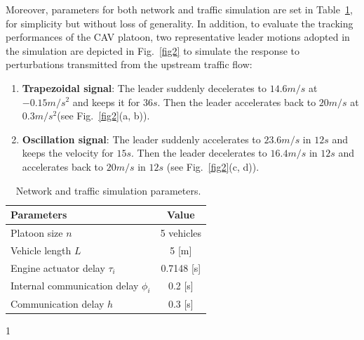 \documentclass[a4paper]{cas-sc}
\begin{document}
Moreover, parameters for both network and traffic simulation are set in Table~\ref{table1}, for simplicity but without loss of generality. In addition, to evaluate the tracking performances of the CAV platoon, two representative leader motions adopted in the simulation are depicted in Fig.~\ref{fig2} to simulate the response to perturbations transmitted from the upstream traffic flow:
\begin{enumerate}
  \item \textbf{Trapezoidal signal}: The leader suddenly decelerates to $14.6m/s$ at $ - 0.15m/{s^2}$ and keeps it for $36s$. Then the leader accelerates back to $20m/s$ at $ 0.3m/{s^2} $(see Fig.~\ref{fig2}(a, b)).
  \item \textbf{Oscillation signal}: The leader suddenly accelerates to $23.6m/s$ in $12s$ and keeps the velocity for $15s$. Then the leader decelerates to $16.4m/s$ in $12s$ and accelerates back to $20m/s$ in $12s$ (see Fig.~\ref{fig2}(c, d)).
\end{enumerate}

\begin{table}
  \centering
  \setlength{\abovecaptionskip}{0pt}
  \setlength{\belowcaptionskip}{10pt}%
  \begin{threeparttable}[b]
    \caption{~Network and traffic simulation parameters.}
    \label{table1}
    {\begin{tabular}{lc} \toprule
        Parameters                              & Value                \\ \midrule
        Platoon size $n$                        & 5 vehicles           \\
        Vehicle length $L$                      & 5 [m]                \\
        Engine actuator delay $\tau_i$          & 0.7148 [s]           \\
        Internal communication delay $\phi_{i}$ & 0.2 [s]              \\
        Communication delay $h$                 & 0.3 [s]    \tnote{1} \\
        \bottomrule
      \end{tabular}}
    \begin{tablenotes}
      \item[1] \citep{Vukadinovic2018a,Wang2018e}
    \end{tablenotes}
  \end{threeparttable}
\end{table}
\end{document}
